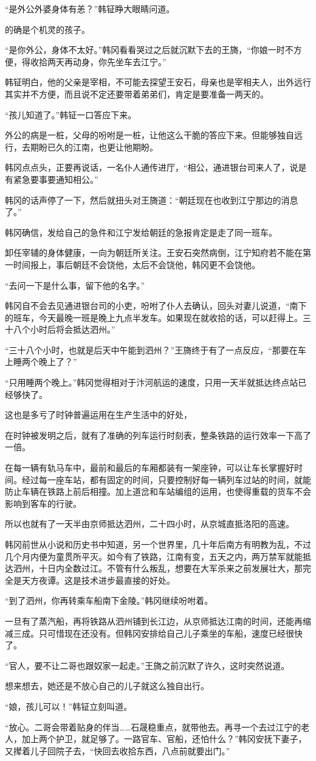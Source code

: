 “是外公外婆身体有恙？”韩钲睁大眼睛问道。

的确是个机灵的孩子。

“是你外公，身体不太好。”韩冈看看哭过之后就沉默下去的王旖，“你娘一时不方便，得收拾两天再动身，你先坐车去江宁。”

韩钲明白，他的父亲是宰相，不可能去探望王安石，母亲也是宰相夫人，出外远行其实并不方便，而且说不定还要带着弟弟们，肯定是要准备一两天的。

“孩儿知道了。”韩钲一口答应下来。

外公的病是一桩，父母的吩咐是一桩，让他这么干脆的答应下来。但能够独自远行，去期盼已久的江南，也更让他期盼。

韩冈点点头，正要再说话，一名仆人通传进厅，“相公，通进银台司来人了，说是有紧急要事要通知相公。”

韩冈的话声停了一下，然后就扭头对王旖道：“朝廷现在也收到江宁那边的消息了。”

韩冈确信，发给自己的急件和江宁发给朝廷的急报肯定是走了同一班车。

卸任宰辅的身体健康，一向为朝廷所关注。王安石突然病倒，江宁知府若不能在第一时间报上，事后朝廷不会饶他，太后不会饶他，韩冈更不会饶他。

“去问一下是什么事，留下他的名字。”

韩冈自不会去见通进银台司的小吏，吩咐了仆人去确认，回头对妻儿说道，“南下的班车，今天最晚一班是晚上九点半发车。如果现在就收拾的话，可以赶得上。三十八个小时后将会抵达泗州。”

“三十八个小时，也就是后天中午能到泗州？”王旖终于有了一点反应，“那要在车上睡两个晚上了？”

“只用睡两个晚上。”韩冈觉得相对于汴河航运的速度，只用一天半就抵达终点站已经够快了。

这也是多亏了时钟普遍运用在生产生活中的好处，

在时钟被发明之后，就有了准确的列车运行时刻表，整条铁路的运行效率一下高了一倍。

在每一辆有轨马车中，最前和最后的车厢都装有一架座钟，可以让车长掌握好时间。经过每一座车站，都有固定的时间，只要控制好每一辆列车过站的时间，就能防止车辆在铁路上前后相撞。加上道岔和车站编组的运用，也使得重载的货车不会影响到客车的行驶。

所以也就有了一天半由京师抵达泗州，二十四小时，从京城直抵洛阳的高速。

韩冈前世从小说和历史书中知道，另一个世界里，几十年后南方有明教为乱，不过几个月内便为童贯所平灭。如今有了铁路，江南有变，五天之内，两万禁军就能抵达泗州，十日内全数过江。不管有什么叛乱，想要在大军杀来之前发展壮大，那完全是天方夜谭。这是技术进步最直接的好处。

“到了泗州，你再转乘车船南下金陵。”韩冈继续吩咐着。

一旦有了蒸汽船，再将铁路从泗州铺到长江边，从京师抵达江南的时间，还能再缩减三成。只可惜现在还没有。但韩冈安排给自己儿子乘坐的车船，速度已经很快了。

“官人，要不让二哥也跟奴家一起走。”王旖之前沉默了许久，这时突然说道。

想来想去，她还是不放心自己的儿子就这么独自出行。

“娘，孩儿可以！”韩钲立刻叫道。

“放心。二哥会带着贴身的伴当……石晟稳重点，就带他去。再寻一个去过江宁的老人，加上两个护卫，就足够了。一路官车、官船，还怕什么？”韩冈安抚下妻子，又撵着儿子回院子去，“快回去收拾东西，八点前就要出门。”
